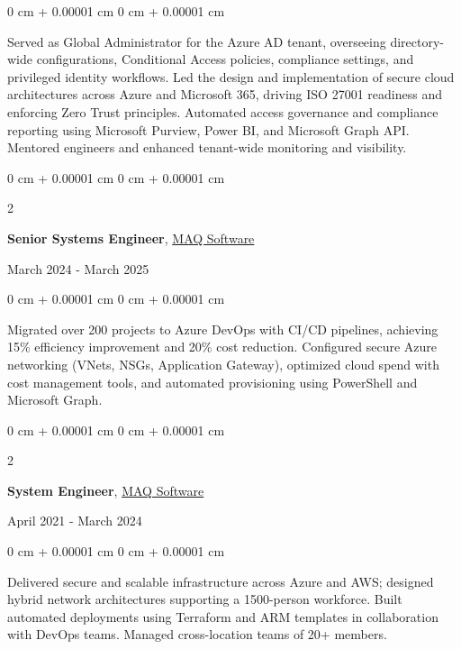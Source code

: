 \documentclass[10pt, letterpaper]{article}
\newenvironment{onecolentry}{
    \begin{adjustwidth}{
        0 cm + 0.00001 cm
    }{
        0 cm + 0.00001 cm
    }
}{
    \end{adjustwidth}
}
\newenvironment{twocolentry}[2][]{
    \onecolentry
    \def\secondColumn{#2}
    \setcolumnwidth{\fill, 4.5 cm}
    \begin{paracol}{2}
}{
    \switchcolumn \raggedleft \secondColumn
    \end{paracol}
    \endonecolentry
}
\begin{document}
\vspace{0.10 cm}
\begin{onecolentry}
    Served as Global Administrator for the Azure AD tenant, overseeing directory-wide configurations, Conditional Access policies, compliance settings, and privileged identity workflows. Led the design and implementation of secure cloud architectures across Azure and Microsoft 365, driving ISO 27001 readiness and enforcing Zero Trust principles. Automated access governance and compliance reporting using Microsoft Purview, Power BI, and Microsoft Graph API. Mentored engineers and enhanced tenant-wide monitoring and visibility.
\end{onecolentry}

\vspace{0.2 cm}

\begin{twocolentry}{March 2024 - March 2025}
    \textbf{Senior Systems Engineer}, \href{https://maqsoftware.com/}{MAQ Software}
\end{twocolentry}

\vspace{0.10 cm}
\begin{onecolentry}
    Migrated over 200 projects to Azure DevOps with CI/CD pipelines, achieving 15\% efficiency improvement and 20\% cost reduction. Configured secure Azure networking (VNets, NSGs, Application Gateway), optimized cloud spend with cost management tools, and automated provisioning using PowerShell and Microsoft Graph.
\end{onecolentry}

\vspace{0.2 cm}

\begin{twocolentry}{April 2021 - March 2024}
    \textbf{System Engineer}, \href{https://maqsoftware.com/}{MAQ Software}
\end{twocolentry}

\vspace{0.10 cm}
\begin{onecolentry}
    Delivered secure and scalable infrastructure across Azure and AWS; designed hybrid network architectures supporting a 1500-person workforce. Built automated deployments using Terraform and ARM templates in collaboration with DevOps teams. Managed cross-location teams of 20+ members.
\end{onecolentry}

\vspace{0.2 cm}
\end{document}
